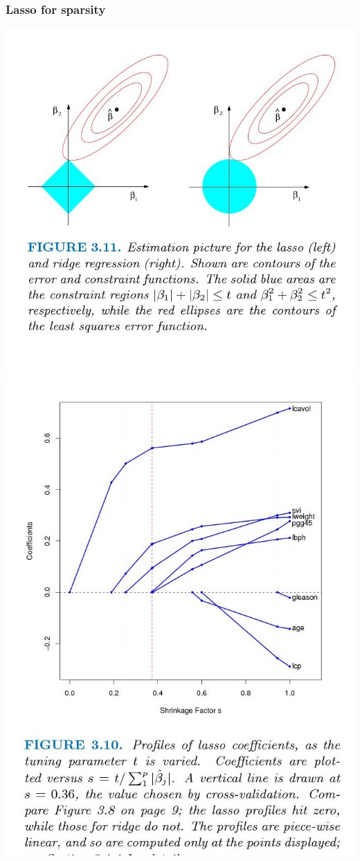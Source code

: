 \documentclass{beamer}
\begin{document}
\begin{frame}
\frametitle{Lasso for sparsity}
\includegraphics[scale=0.15]{images/figures3-10.jpg}
\includegraphics[scale=0.15]{images/figures3-9.jpg}

\end{frame}
\end{document}
